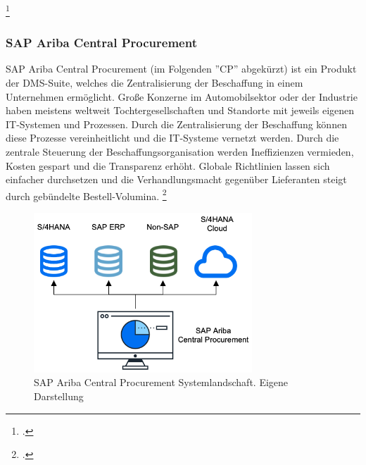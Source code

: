 \footcite[Vgl.][]{theorie_sap_contract_price_renegotiation_2024}

\subsubsection{SAP Ariba Central Procurement}

SAP Ariba Central Procurement (im Folgenden ''CP'' abgekürzt) ist ein Produkt der DMS-Suite, welches die Zentralisierung der Beschaffung in einem Unternehmen ermöglicht. Gro\ss e Konzerne im Automobilsektor oder der Industrie haben meistens weltweit Tochtergesellschaften und Standorte mit jeweils eigenen IT-Systemen und Prozessen. Durch die Zentralisierung der Beschaffung können diese Prozesse vereinheitlicht und die IT-Systeme vernetzt werden. Durch die zentrale Steuerung der Beschaffungsorganisation werden Ineffizienzen vermieden, Kosten gespart und die Transparenz erhöht. Globale Richtlinien lassen sich einfacher durchsetzen und die Verhandlungsmacht gegenüber Lieferanten steigt durch gebündelte Bestell-Volumina. \footcite[Vgl.][]{theorie_sap_central_procurement_overview_2024}

\begin{figure}[H]
    \centering
    \includegraphics[height=6cm]{Bilder/Central_Procurement_System_Landscape.png}
    \caption[SAP Ariba Central Procurement Systemlandschaft]{SAP Ariba Central Procurement Systemlandschaft. Eigene Darstellung}
    \label{fig:Central_Procurement_System_Landscape}
\end{figure}

